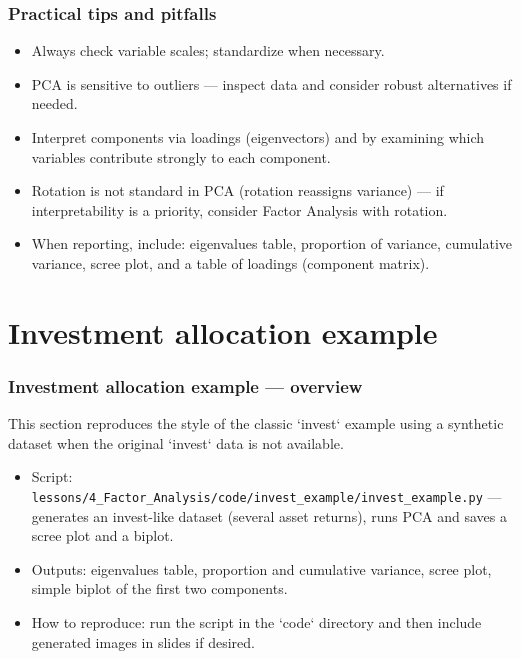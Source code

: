 \documentclass[aspectratio=169]{beamer}
\begin{document}
\begin{frame}
    \frametitle{Practical tips and pitfalls}
    \begin{itemize}
        \item Always check variable scales; standardize when necessary. \pause
        \item PCA is sensitive to outliers — inspect data and consider robust alternatives if needed. \pause
        \item Interpret components via loadings (eigenvectors) and by examining which variables contribute strongly to each component. \pause
        \item Rotation is not standard in PCA (rotation reassigns variance) — if interpretability is a priority, consider Factor Analysis with rotation. \pause
        \item When reporting, include: eigenvalues table, proportion of variance, cumulative variance, scree plot, and a table of loadings (component matrix). \pause
    \end{itemize}
\end{frame}

\section{Investment allocation example}

\begin{frame}
    \frametitle{Investment allocation example — overview}
    This section reproduces the style of the classic `invest` example using a synthetic dataset when the original `invest` data is not available.
    \begin{itemize}
        \item Script: \texttt{lessons/4\_Factor\_Analysis/code/invest\_example/invest\_example.py} — generates an invest-like dataset (several asset returns), runs PCA and saves a scree plot and a biplot. \pause
        \item Outputs: eigenvalues table, proportion and cumulative variance, scree plot, simple biplot of the first two components. \pause
        \item How to reproduce: run the script in the `code` directory and then include generated images in slides if desired. \pause
    \end{itemize}
    \vspace{6pt}
\end{frame}
\end{document}
